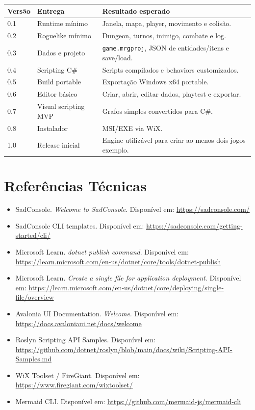 \documentclass[12pt,a4paper]{article}
\begin{document}
\begin{longtable}{p{2.5cm}p{5.5cm}p{6.0cm}}
\toprule
\textbf{Versão} & \textbf{Entrega} & \textbf{Resultado esperado} \\
\midrule
0.1 & Runtime mínimo & Janela, mapa, player, movimento e colisão. \\
0.2 & Roguelike mínimo & Dungeon, turnos, inimigo, combate e log. \\
0.3 & Dados e projeto & \texttt{game.mrgproj}, JSON de entidades/itens e save/load. \\
0.4 & Scripting C\# & Scripts compilados e behaviors customizados. \\
0.5 & Build portable & Exportação Windows x64 portable. \\
0.6 & Editor básico & Criar, abrir, editar dados, playtest e exportar. \\
0.7 & Visual scripting MVP & Grafos simples convertidos para C\#. \\
0.8 & Instalador & MSI/EXE via WiX. \\
1.0 & Release inicial & Engine utilizável para criar ao menos dois jogos exemplo. \\
\bottomrule
\end{longtable}

\section{Referências Técnicas}

\begin{itemize}
    \item SadConsole. \textit{Welcome to SadConsole}. Disponível em: \url{https://sadconsole.com/}
    \item SadConsole CLI templates. Disponível em: \url{https://sadconsole.com/getting-started/cli/}
    \item Microsoft Learn. \textit{dotnet publish command}. Disponível em: \url{https://learn.microsoft.com/en-us/dotnet/core/tools/dotnet-publish}
    \item Microsoft Learn. \textit{Create a single file for application deployment}. Disponível em: \url{https://learn.microsoft.com/en-us/dotnet/core/deploying/single-file/overview}
    \item Avalonia UI Documentation. \textit{Welcome}. Disponível em: \url{https://docs.avaloniaui.net/docs/welcome}
    \item Roslyn Scripting API Samples. Disponível em: \url{https://github.com/dotnet/roslyn/blob/main/docs/wiki/Scripting-API-Samples.md}
    \item WiX Toolset / FireGiant. Disponível em: \url{https://www.firegiant.com/wixtoolset/}
    \item Mermaid CLI. Disponível em: \url{https://github.com/mermaid-js/mermaid-cli}
\end{itemize}
\end{document}
